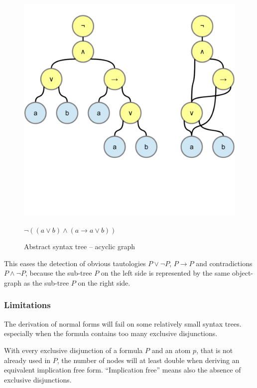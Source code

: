 \begin{figure}[htb]
\begin{center}
\includegraphics[scale=0.5,trim=0cm 5.4cm 0cm 1cm,clip=true]{diagrams/AcyclicSyntaxGraph.pdf}
\caption{Abstract syntax tree – acyclic graph }{$\neg( (a\vee b) \wedge (a \rightarrow a\vee b))$}
\label{fig:AST+ASG}
\end{center}
\end{figure}

This eases the detection of obvious tautologies $P \vee \neg P$, $P \rightarrow P$ and contradictions $P \wedge \neg P$,
because the sub-tree $P$ on the left side is represented by the same object-graph as the sub-tree $P$ on the right side.

\subsubsection{Limitations}

The derivation of normal forms will fail on some relatively small syntax trees.
especially when the formula contains too many exclusive disjunctions.

With every exclusive disjunction of a formula $P$ and an atom $p$, 
that is not already used in $P$,
the number of nodes will at least double 
when deriving an equivalent implication free form.
“Implication free” means also the absence of exclusive disjunctions. %

